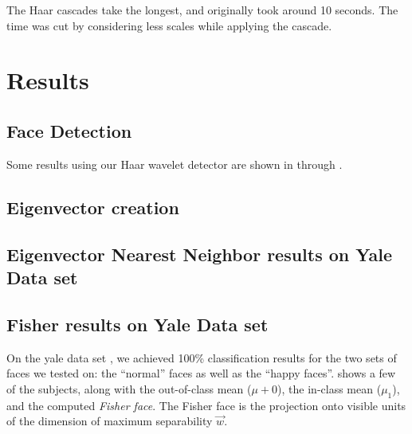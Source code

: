 The Haar cascades take the longest, and originally took around 10
seconds.  The time was cut by considering less scales while applying
the cascade.

\section{Results} %

\subsection{Face Detection}


Some results using our Haar wavelet detector are shown in
 through .





\subsection{Eigenvector creation}


\subsection{Eigenvector Nearest Neighbor results on Yale Data set}


\subsection{Fisher results on Yale Data set}

On the yale data set \cite{YaleFace}, we achieved 100\% classification
results for the two sets of faces we tested on: the ``normal'' faces
as well as the ``happy faces''.   shows a
few of the subjects, along with the out-of-class mean ($\mu+0$), the
in-class mean ($\mu_1$), and the computed \emph{Fisher face}.  The
Fisher face is the projection onto visible units of the dimension of
maximum separability $\vec w$.

